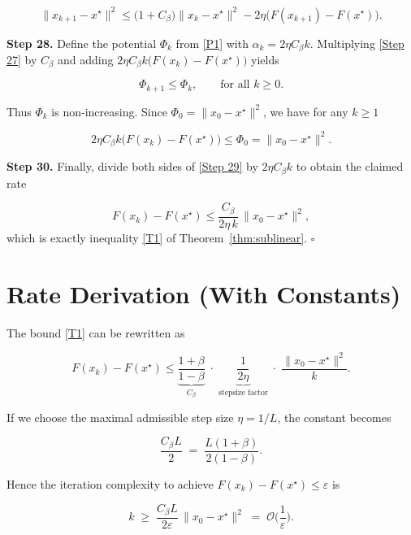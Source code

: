 \documentclass{article}
\begin{document}
\[
\|x_{k+1}-x^{\star}\|^{2}
\le \big(1+C_{\beta}\big)\|x_{k}-x^{\star}\|^{2}
      -2\eta\big(F(x_{k+1})-F(x^{\star})\big).
\tag{Step 27}
\]

\medskip
\noindent\textbf{Step 28.}  Define the potential $\Phi_{k}$ from \eqref{P1} with $\alpha_{k}=2\eta C_{\beta}k$.  Multiplying \eqref{Step 27} by $C_{\beta}$ and adding $2\eta C_{\beta}k\big(F(x_{k})-F(x^{\star})\big)$ yields

\[
\Phi_{k+1}\le \Phi_{k},
\qquad\text{for all }k\ge0.
\tag{Step 28}
\]

Thus $\Phi_{k}$ is non‑increasing.  Since $\Phi_{0}= \|x_{0}-x^{\star}\|^{2}$, we have for any $k\ge1$  

\[
2\eta C_{\beta}k\big(F(x_{k})-F(x^{\star})\big)
\le \Phi_{0}= \|x_{0}-x^{\star}\|^{2}.
\tag{Step 29}
\]

\medskip
\noindent\textbf{Step 30.}  Finally, divide both sides of \eqref{Step 29} by $2\eta C_{\beta}k$ to obtain the claimed rate

\[
F(x_{k})-F(x^{\star})\le
\frac{C_{\beta}}{2\eta\,k}\,\|x_{0}-x^{\star}\|^{2},
\tag{Step 30}
\]
which is exactly inequality \eqref{T1} of Theorem~\ref{thm:sublinear}.  $\square$

\section*{Rate Derivation (With Constants)}
The bound \eqref{T1} can be rewritten as  

\[
F(x_{k})-F(x^{\star})\le
\underbrace{\frac{1+\beta}{1-\beta}}_{\displaystyle C_{\beta}}
\;\cdot\;
\underbrace{\frac{1}{2\eta}}_{\displaystyle\text{stepsize factor}}
\;\cdot\;
\frac{\|x_{0}-x^{\star}\|^{2}}{k}.
\]

If we choose the maximal admissible step size $\eta=1/L$, the constant becomes  

\[
\frac{C_{\beta}L}{2}\;=\;\frac{L(1+\beta)}{2(1-\beta)}.
\]

Hence the iteration complexity to achieve $F(x_{k})-F(x^{\star})\le\varepsilon$ is  

\[
k\;\ge\;
\frac{C_{\beta}L}{2\varepsilon}\,\|x_{0}-x^{\star}\|^{2}
\;=\;
\mathcal{O}\!\Big(\frac{1}{\varepsilon}\Big).
\]

\end{document}
